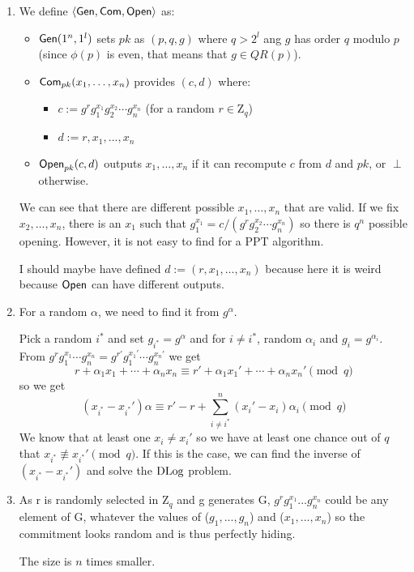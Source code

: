 \begin{solution}
  \begin{enumerate}
    \item
      We define $\langle \operatorname{\mathsf{Gen}}, \operatorname{\mathsf{Com}}, \operatorname{\mathsf{Open}} \rangle$ as:
      \begin{itemize}
        \item $\operatorname{\mathsf{Gen}}(1^n, 1^l)$ sets $pk$ as $(p,q,g)$ where $q > 2^l$ ang $g$ has order $q$ modulo $p$ (since $\phi(p)$ is even, that means that $g \in QR(p)$).
        \item $\operatorname{\mathsf{Com}}_{pk}(x_1, \ldots, x_n)$ provides $(c,d)$ where:
          \begin{itemize}
            \item $c := g^r g_1^{x_1} g_2^{x_2} \cdots g_n^{x_n}$ (for a random $r \in \mathrm{Z}_q$)
            \item $d := r,x_1,...,x_n$
          \end{itemize}
        \item $\operatorname{\mathsf{Open}}_{pk}(c,d)$ outputs $x_1, \ldots, x_n$ if it can recompute $c$ from $d$ and $pk$,
          or $\perp$ otherwise.
      \end{itemize}
      We can see that there are different possible $x_1, \ldots, x_n$ that are valid.
      If we fix $x_2, \ldots, x_n$,
      there is an $x_1$ such that $g_1^{x_1} = c / (g^r g_2^{x_2} \cdots g_n^{x_n})$
      so there is $q^n$ possible opening.
      However, it is not easy to find for a PPT algorithm.

      I should maybe have defined $d := (r, x_1, \ldots, x_n)$ because here it is weird because $\operatorname{\mathsf{Open}}$ can have different outputs.
    \item %
    
      For a random $\alpha$, we need to find it from $g^\alpha$.

      Pick a random $i^*$ and set $g_{i^*} = g^\alpha$ and for $i \neq i^*$, random $\alpha_i$ and $g_i = g^{\alpha_i}$.
      From $g^rg_1^{x_1} \cdots g_n^{x_n} = g^{r'}g_1^{x_1'} \cdots g_n^{x_n'}$ we get
      \[ r + \alpha_1 x_1 + \cdots + \alpha_n x_n \equiv r' + \alpha_1 x_1' + \cdots + \alpha_n x_n' \pmod{q} \]
      so we get
      \[ (x_{i^*} - x_{i^*}') \alpha \equiv r' - r + \sum_{i \neq i^*}^n (x_i' - x_i) \alpha_i \pmod{q} \]
      We know that at least one $x_i \neq x_i'$ so we have at least one chance out of $q$ that $x_{i^*} \not\equiv x_{i^*}' \pmod{q}$.
      If this is the case, we can find the inverse of $(x_{i^*} - x_{i^*}')$ and solve the $\operatorname{DLog}$ problem.
    \item
      As r is randomly selected in $\mathrm{Z}_q$ and g generates G, $g^rg_1^{x_1}...g_n^{x_n}$ could be any element of G, whatever the values of ($g_1,...,g_n$) and ($x_1,...,x_n$) so the commitment looks random and is thus perfectly hiding.

      The size is $n$ times smaller.
  \end{enumerate}
\end{solution}

